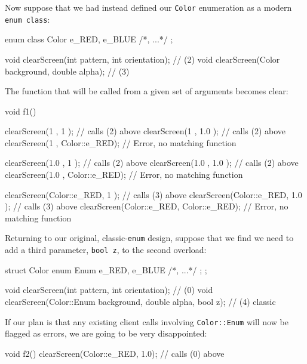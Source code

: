 \noindent Now suppose that we had instead defined our \lstinline!Color! enumeration
as a modern \lstinline!enum!~\lstinline!class!:

\begin{emcppslisting}[emcppsbatch=e8]
enum class Color { e_RED, e_BLUE /*, ...*/ };

void clearScreen(int pattern, int orientation);    // (2)
void clearScreen(Color background, double alpha);  // (3)
\end{emcppslisting}

\noindent The function that will be called from a given set of arguments becomes
clear:

\begin{emcppslisting}[emcppsbatch=e8]
void f1()
{
    clearScreen(1           , 1           );  // calls (2) above
    clearScreen(1           , 1.0         );  // calls (2) above
    clearScreen(1           , Color::e_RED);  // Error, no matching function

    clearScreen(1.0         , 1           );  // calls (2) above
    clearScreen(1.0         , 1.0         );  // calls (2) above
    clearScreen(1.0         , Color::e_RED);  // Error, no matching function

    clearScreen(Color::e_RED, 1           );  // calls (3) above
    clearScreen(Color::e_RED, 1.0         );  // calls (3) above
    clearScreen(Color::e_RED, Color::e_RED);  // Error, no matching function
}
\end{emcppslisting}

\noindent Returning to our original, classic-\lstinline!enum! design, suppose that we
find we need to add a third parameter, \lstinline!bool!~\lstinline!z!, to the
second overload:

\begin{emcppshiddenlisting}[emcppsbatch=e9]
struct Color
{
    enum Enum { e_RED, e_BLUE /*, ...*/ };
};
\end{emcppshiddenlisting}
\begin{emcppslisting}[emcppsbatch=e9]
void clearScreen(int pattern, int orientation);                  // (0)
void clearScreen(Color::Enum background, double alpha, bool z);  // (4) classic
\end{emcppslisting}

\noindent If our plan is that any existing client calls involving
\lstinline!Color::Enum! will now be flagged as errors, we are going to be
very disappointed:

\begin{emcppslisting}[emcppsbatch=e9]
void f2()
{
    clearScreen(Color::e_RED, 1.0);  // calls (0) above
}
\end{emcppslisting}

